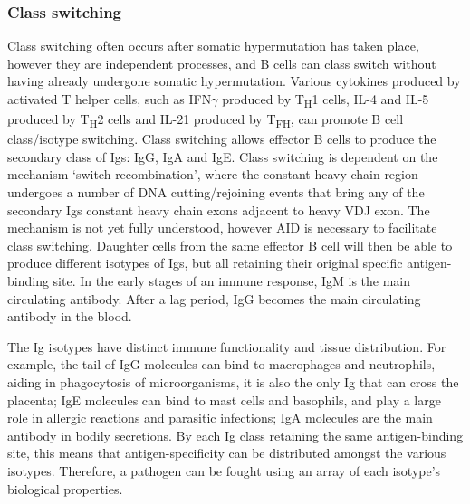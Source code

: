 \subsubsection{Class switching}
Class switching often occurs after somatic hypermutation has taken place, however they are independent processes, and B cells can class switch without having already undergone somatic hypermutation\cite{mak2014b}.
Various cytokines produced by activated T helper cells, such as IFN$\gamma$ produced by T\textsubscript{H}1 cells, IL-4 and IL-5 produced by T\textsubscript{H}2 cells and IL-21 produced by T\textsubscript{FH}, can promote B cell class/isotype switching.
Class switching allows effector B cells to produce the secondary class of Igs: IgG, IgA and IgE\@.
Class switching is dependent on the mechanism `switch recombination', where the constant heavy chain region undergoes a number of DNA cutting/rejoining events that bring any of the secondary Igs constant heavy chain exons adjacent to heavy VDJ exon\cite{mak2014b}.
The mechanism is not yet fully understood, however AID is necessary to facilitate class switching.
Daughter cells from the same effector B cell will then be able to produce different isotypes of Igs, but all retaining their original specific antigen-binding site.
In the early stages of an immune response, IgM is the main circulating antibody.
After a lag period, IgG becomes the main circulating antibody in the blood\cite{alberts2007molecularimmune}.

The Ig isotypes have distinct immune functionality and tissue distribution.
For example, the tail of IgG molecules can bind to macrophages and neutrophils, aiding in phagocytosis of microorganisms, it is also the only Ig that can cross the placenta; IgE molecules can bind to mast cells and basophils, and play a large role in allergic reactions and parasitic infections; IgA molecules are the main antibody in bodily secretions\cite{alberts2007molecularimmune}.
By each Ig class retaining the same antigen-binding site, this means that antigen-specificity can be distributed amongst the various isotypes.
Therefore, a pathogen can be fought using an array of each isotype's biological properties\cite{xu2012immunoglobulin}.


